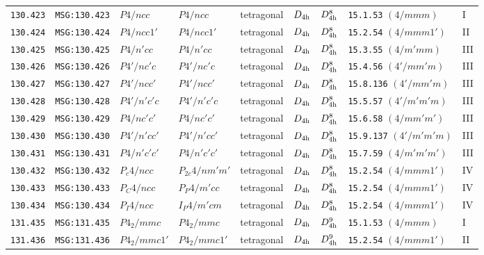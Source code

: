 \documentclass[fleqn,10pt]{jsarticle}
\begin{document}
\begin{center}
\begin{longtable}{lllllllll}
\texttt{130.423} & \texttt{MSG:130.423} & $P4/ncc$ & $P4/ncc$ & tetragonal & $D_{\rm 4h}$ & $D_{\rm 4h}^{8}$ & \texttt{15.1.53} $(4/mmm)$ & I \\
\texttt{130.424} & \texttt{MSG:130.424} & $P4/ncc1'$ & $P4/ncc1'$ & tetragonal & $D_{\rm 4h}$ & $D_{\rm 4h}^{8}$ & \texttt{15.2.54} $(4/mmm1')$ & II \\
\texttt{130.425} & \texttt{MSG:130.425} & $P4/n'cc$ & $P4/n'cc$ & tetragonal & $D_{\rm 4h}$ & $D_{\rm 4h}^{8}$ & \texttt{15.3.55} $(4/m'mm)$ & III \\
\texttt{130.426} & \texttt{MSG:130.426} & $P4'/nc'c$ & $P4'/nc'c$ & tetragonal & $D_{\rm 4h}$ & $D_{\rm 4h}^{8}$ & \texttt{15.4.56} $(4'/mm'm)$ & III \\
\texttt{130.427} & \texttt{MSG:130.427} & $P4'/ncc'$ & $P4'/ncc'$ & tetragonal & $D_{\rm 4h}$ & $D_{\rm 4h}^{8}$ & \texttt{15.8.136} $(4'/mm'm)$ & III \\
\texttt{130.428} & \texttt{MSG:130.428} & $P4'/n'c'c$ & $P4'/n'c'c$ & tetragonal & $D_{\rm 4h}$ & $D_{\rm 4h}^{8}$ & \texttt{15.5.57} $(4'/m'm'm)$ & III \\
\texttt{130.429} & \texttt{MSG:130.429} & $P4/nc'c'$ & $P4/nc'c'$ & tetragonal & $D_{\rm 4h}$ & $D_{\rm 4h}^{8}$ & \texttt{15.6.58} $(4/mm'm')$ & III \\
\texttt{130.430} & \texttt{MSG:130.430} & $P4'/n'cc'$ & $P4'/n'cc'$ & tetragonal & $D_{\rm 4h}$ & $D_{\rm 4h}^{8}$ & \texttt{15.9.137} $(4'/m'm'm)$ & III \\
\texttt{130.431} & \texttt{MSG:130.431} & $P4/n'c'c'$ & $P4/n'c'c'$ & tetragonal & $D_{\rm 4h}$ & $D_{\rm 4h}^{8}$ & \texttt{15.7.59} $(4/m'm'm')$ & III \\
\texttt{130.432} & \texttt{MSG:130.432} & $P_{c}4/ncc$ & $P_{2c}4/nm'm'$ & tetragonal & $D_{\rm 4h}$ & $D_{\rm 4h}^{8}$ & \texttt{15.2.54} $(4/mmm1')$ & IV \\
\texttt{130.433} & \texttt{MSG:130.433} & $P_{C}4/ncc$ & $P_{P}4/m'cc$ & tetragonal & $D_{\rm 4h}$ & $D_{\rm 4h}^{8}$ & \texttt{15.2.54} $(4/mmm1')$ & IV \\
\texttt{130.434} & \texttt{MSG:130.434} & $P_{I}4/ncc$ & $I_{P}4/m'cm$ & tetragonal & $D_{\rm 4h}$ & $D_{\rm 4h}^{8}$ & \texttt{15.2.54} $(4/mmm1')$ & IV \\ \hline
\texttt{131.435} & \texttt{MSG:131.435} & $P4_{2}/mmc$ & $P4_{2}/mmc$ & tetragonal & $D_{\rm 4h}$ & $D_{\rm 4h}^{9}$ & \texttt{15.1.53} $(4/mmm)$ & I \\
\texttt{131.436} & \texttt{MSG:131.436} & $P4_{2}/mmc1'$ & $P4_{2}/mmc1'$ & tetragonal & $D_{\rm 4h}$ & $D_{\rm 4h}^{9}$ & \texttt{15.2.54} $(4/mmm1')$ & II \\

\end{longtable}
\end{center}
\end{document}
